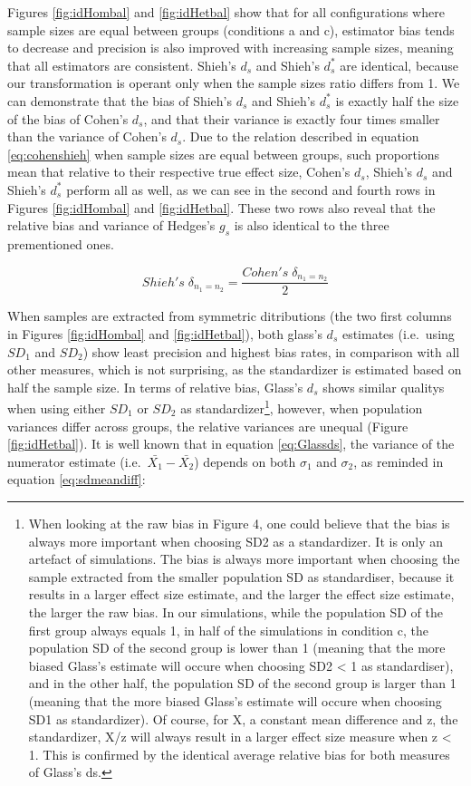 \documentclass[
  man,floatsintext]{apa6}
\begin{document}
Figures \ref{fig:idHombal} and \ref{fig:idHetbal} show that for all configurations where sample sizes are equal between groups (conditions a and c), estimator bias tends to decrease and precision is also improved with increasing sample sizes, meaning that all estimators are consistent. Shieh's \(d_s\) and Shieh's \(d^*_s\) are identical, because our transformation is operant only when the sample sizes ratio differs from 1. We can demonstrate that the bias of Shieh's \(d_s\) and Shieh's \(d_s^*\) is exactly half the size of the bias of Cohen's \(d_s\), and that their variance is exactly four times smaller than the variance of Cohen's \(d_s\). Due to the relation described in equation \ref{eq:cohenshieh} when sample sizes are equal between groups, such proportions mean that relative to their respective true effect size, Cohen's \(d_s\), Shieh's \(d_s\) and Shieh's \(d^*_s\) perform all as well, as we can see in the second and fourth rows in Figures \ref{fig:idHombal} and \ref{fig:idHetbal}. These two rows also reveal that the relative bias and variance of Hedges's \(g_s\) is also identical to the three prementioned ones.

\begin{equation} 
Shieh's \; \delta_{n_1=n_2}= \frac{Cohen's \; \delta_{n_1=n_2}}{2}
\label{eq:cohenshieh}
\end{equation}

When samples are extracted from symmetric ditributions (the two first columns in Figures \ref{fig:idHombal} and \ref{fig:idHetbal}), both glass's \(d_s\) estimates (i.e.~using \(SD_1\) and \(SD_2\)) show least precision and highest bias rates, in comparison with all other measures, which is not surprising, as the standardizer is estimated based on half the sample size. In terms of relative bias, Glass's \(d_s\) shows similar qualitys when using either \(SD_1\) or \(SD_2\) as standardizer\footnote{When looking at the raw bias in Figure 4, one could believe that the bias is always more important when choosing SD2 as a standardizer. It is only an artefact of simulations. The bias is always more important when choosing the sample extracted from the smaller population SD as standardiser, because it results in a larger effect size estimate, and the larger the effect size estimate, the larger the raw bias. In our simulations, while the population SD of the first group always equals 1, in half of the simulations in condition c, the population SD of the second group is lower than 1 (meaning that the more biased Glass's estimate will occure when choosing SD2 < 1 as standardiser), and in the other half, the population SD of the second group is larger than 1 (meaning that the more biased Glass's estimate will occure when choosing SD1 as standardizer). Of course, for X, a constant mean difference and z, the standardizer, X/z will always result in a larger effect size measure when z < 1. This is confirmed by the identical average relative bias for both measures of Glass's ds.}, however, when population variances differ across groups, the relative variances are unequal (Figure \ref{fig:idHetbal}). It is well known that in equation \ref{eq:Glassds}, the variance of the numerator estimate (i.e.~\(\bar{X_1}-\bar{X_2}\)) depends on both \(\sigma_1\) and \(\sigma_2\), as reminded in equation \ref{eq:sdmeandiff}:
\end{document}
